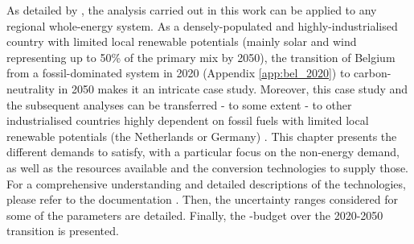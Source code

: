 
%
%
%

As detailed by \citet{limpens2024pathway}, the analysis carried out in this work can be applied to any regional whole-energy system. As a densely-populated and highly-industrialised country with limited local renewable potentials (\ie mainly solar and wind representing up to 50\% of the primary mix by 2050), the transition of Belgium from a fossil-dominated system in 2020 (Appendix \ref{app:bel_2020}) to carbon-neutrality in 2050 makes it an intricate case study. Moreover, this case study and the subsequent analyses can be transferred - to some extent - to other industrialised countries highly dependent on fossil fuels with limited local renewable potentials (\eg the Netherlands or Germany) \cite{dommisse2020modelling}. This chapter presents the different demands to satisfy, with a particular focus on the non-energy demand, as well as the resources available and the conversion technologies to supply those. For a comprehensive understanding and detailed descriptions of the technologies, please refer to the documentation \cite{readthedocs_pathway}. Then, the uncertainty ranges considered for some of the parameters are detailed. Finally, the -budget over the 2020-2050 transition is presented.

